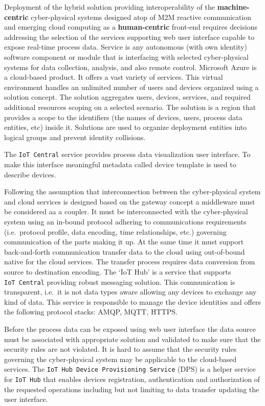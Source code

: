 \documentclass[
]{article}
\begin{document}
Deployment of the hybrid solution providing interoperability of the
\textbf{machine-centric} cyber-physical systems designed atop of M2M
reactive communication and emerging cloud computing as a
\textbf{human-centric} front-end requires decisions addressing the
selection of the services supporting web user interface capable to
expose real-time process data. Service is any autonomous (with own
identity) software component or module that is interfacing with selected
cyber-physical systems for data collection, analysis, and also remote
control. Microsoft Azure is a cloud-based product. It offers a vast
variety of services. This virtual environment handles an unlimited
number of users and devices organized using a solution concept. The
solution aggregates users, devices, services, and required additional
resources scoping on a selected scenario. The solution is a region that
provides a scope to the identifiers (the names of devices, users,
process data entities, etc) inside it. Solutions are used to organize
deployment entities into logical groups and prevent identity collisions.

The \texttt{IoT\ Central} service provides process data visualization
user interface. To make this interface meaningful metadata called device
template is used to describe devices.

Following the assumption that interconnection between the cyber-physical
system and cloud services is designed based on the gateway concept a
middleware must be considered aa a coupler. It must be interconnected
with the cyber-physical system using an in-bound protocol adhering to
communications requirements (i.e.~protocol profile, data encoding, time
relationships, etc.) governing communication of the parts making it up.
At the same time it must support back-and-forth communication transfer
data to the cloud using out-of-bound native for the cloud services. The
transfer process requires data conversion from source to destination
encoding. The `IoT Hub' is a service that supports \texttt{IoT\ Central}
providing robust messaging solution. This communication is transparent,
i.e.~it is not data types aware allowing any devices to exchange any
kind of data. This service is responsible to manage the device
identities and offers the following protocol stacks: AMQP, MQTT, HTTPS.

Before the process data can be exposed using web user interface the data
source must be associated with appropriate solution and validated to
make sure that the security rules are not violated. It is hard to assume
that the security rules governing the cyber-physical system may be
applicable to the cloud-based services. The
\texttt{IoT\ Hub\ Device\ Provisioning\ Service} (DPS) is a helper
service for \texttt{IoT\ Hub} that enables devices registration,
authentication and authorization of the requested operations including
but not limiting to data transfer updating the user interface.
\end{document}
